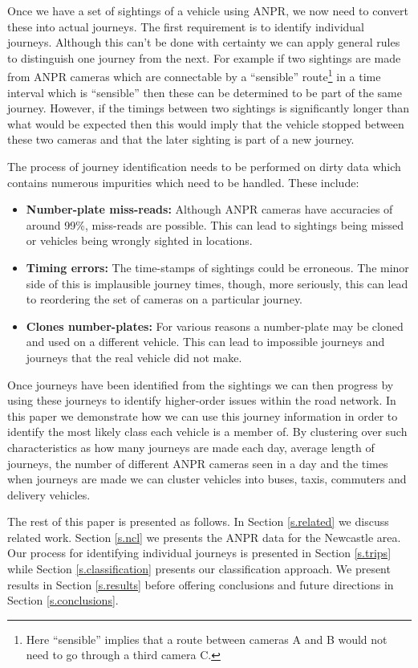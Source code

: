 Once we have a set of sightings of a vehicle using ANPR, we now need to convert these into actual journeys. The first requirement is to identify individual journeys. Although this can't be done with certainty we can apply general rules to distinguish one journey from the next. For example if two sightings are made from ANPR cameras which are connectable by a ``sensible'' route\footnote{Here ``sensible'' implies that a route between cameras A and B would not need to go through a third camera C.} in a time interval which is ``sensible'' then these can be determined to be part of the same journey. However, if the timings between two sightings is significantly longer than what would be expected then this would imply that the vehicle stopped between these two cameras and that the later sighting is part of a new journey.

The process of journey identification needs to be performed on dirty data which contains numerous impurities which need to be handled. These include:

\begin{itemize}
	\item {\bf Number-plate miss-reads:} Although ANPR cameras have accuracies of around {\color{red}99\%}, miss-reads are possible. This can lead to sightings being missed or vehicles being wrongly sighted in locations.
	\item {\bf Timing errors:} The time-stamps of sightings could be erroneous. The minor side of this is implausible journey times, though, more seriously, this can lead to reordering the set of cameras on a particular journey.
	\item {\bf Clones number-plates:} For various reasons a number-plate may be cloned and used on a different vehicle. This can lead to impossible journeys and journeys that the real vehicle did not make.
\end{itemize}

Once journeys have been identified from the sightings we can then progress by using these journeys to identify higher-order issues within the road network. In this paper we demonstrate how we can use this journey information in order to identify the most likely class each vehicle is a member of. By clustering over such characteristics as how many journeys are made each day, average length of journeys, the number of different ANPR cameras seen in a day and the times when journeys are made we can cluster vehicles into buses, taxis, commuters and delivery vehicles.

The rest of this paper is presented as follows. In Section \ref{s.related} we discuss related work. Section \ref{s.ncl} we presents the ANPR data for the Newcastle area. Our process for identifying individual journeys is presented in Section \ref{s.trips} while Section \ref{s.classification} presents our classification approach. We present results in Section \ref{s.results} before offering conclusions and future directions in Section \ref{s.conclusions}.

